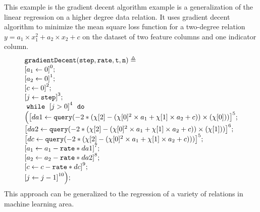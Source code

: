 %
    \begin{example}
        This example is the gradient decent algorithm example is a generalization of the linear regression on a higher degree data relation.
        It uses gradient decent algorithm to minimize 
        the mean square loss function
        for a two-degree relation
         $y = a_1 \times x_1^2 + a_2 \times x_2 + c$
        on the dataset of two feature columns and one indicator column.
     \[
     \begin{array}{l}
     \kw{gradientDecent(step, rate, t, n)} \triangleq \\
        \clabel{ a_1 \leftarrow 0}^{0} ; \\
        \clabel{ a_2 \leftarrow 0}^{1} ; \\
        \clabel{ c \leftarrow 0}^{2} ; \\
        \clabel{\assign{j}{\kw{step}} }^{3} ; \\
        \ewhile ~ \clabel{j > 0}^{4} ~ \edo ~ \\
      \Big(
          \clabel{\assign{da1}{\query(-2 * (\chi[2] - (\chi[0]^2 \times a_1 + \chi[1] \times a_2 + c)) \times (\chi[0]))} }^{5}  ; \\
          \clabel{\assign{da2}{\query(-2 * (\chi[2] - (\chi[0]^2 \times a_1 + \chi[1] \times a_2 + c)) \times (\chi[1]))} }^{6}  ; \\  \clabel{\assign{dc}{\query(-2 * (\chi[2] - (\chi[0]^2 \times a_1 + \chi[1] \times a_2 + c)))} }^{5}  ; \\
          \clabel{\assign{a_1}{a_1 - \kw{rate} * da1} }^{7}  ; \\
          \clabel{\assign{a_2}{a_2 - \kw{rate} * da2} }^{8}  ; \\
          \clabel{\assign{c}{c - \kw{rate} * dc} }^{9}  ; \\
       \clabel{\assign{j}{j-1}}^{10} 
      \Big);
  \end{array}
     \]
        This approach can be generalized to the regression of a variety of 
        relations in machine learning area.
     \end{example}
%

